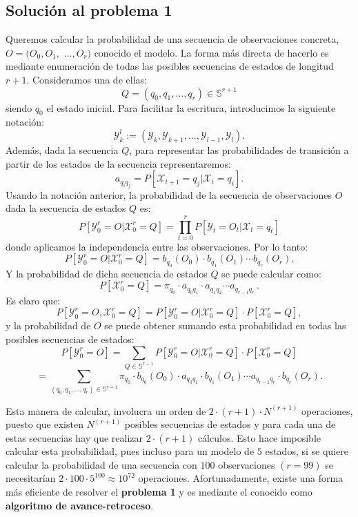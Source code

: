 \subsection{Solución al problema 1}
Queremos calcular la probabilidad de una secuencia de observaciones concreta, $O=(O_0,O_1,$ $\dots, O_r)$ conocido el modelo. La forma más directa de hacerlo es mediante enumeración de todas las posibles secuencias de estados de longitud $r+1$. Consideramos una de ellas:
\[Q=(q_0 , q_1 , \dots , q_r)\in\mathbb{S}^{r+1}\]
siendo $q_0$ el estado inicial. Para facilitar la escritura, introducimos la siguiente notación:
\[\mathcal{Y}_k^l:=(\mathcal{Y}_{k},\mathcal{Y}_{k+1},\dots,\mathcal{Y}_{l-1},\mathcal{Y}_{l}).\]
Además, dada la secuencia $Q$, para representar las probabilidades de transición a partir de los estados de la secuencia representaremos:
\[a_{q_iq_j}=P[\mathcal{X}_{t+1}=q_j|\mathcal{X}_t=q_i].\]
Usando la notación anterior, la probabilidad de la secuencia de observaciones $O$ dada la secuencia de estados $Q$ es:
\[P[\mathcal{Y}_0^r=O|\mathcal{X}_0^r=Q]=\prod_{t=0}^r P[\mathcal{Y}_{t}=O_t|\mathcal{X}_{t}=q_t]\]
donde aplicamos la independencia entre las observaciones. Por lo tanto:
\[P[\mathcal{Y}_0^r=O|\mathcal{X}_0^r=Q]=b_{q_0}(O_0)\cdot b_{q_1}(O_1)\cdots b_{q_r}(O_r).\]
Y la probabilidad de dicha secuencia de estados $Q$ se puede calcular como:
\[P[\mathcal{X}_0^r=Q]=\pi_{q_0}\cdot a_{q_0q_1}\cdot a_{q_1q_2}\cdots a_{q_{r-1}q_r}\,. \]
Es claro que:
\[P[\mathcal{Y}_0^r=O,\mathcal{X}_0^r=Q]=P[\mathcal{Y}_0^r=O|\mathcal{X}_0^r=Q]\cdot P[\mathcal{X}_0^r=Q], \]
y la probabilidad de $O$ se puede obtener sumando esta probabilidad en todas las posibles secuencias de estados:
\[P[\mathcal{Y}_0^r=O]=\sum_{Q\in\mathbb{S}^{r+1}}P[\mathcal{Y}_0^r=O|\mathcal{X}_0^r=Q]\cdot P[\mathcal{X}_0^r=Q]\]
\[=\sum_{(q_0 , q_1 , \dots , q_r)\in\mathbb{S}^{r+1}}\pi_{q_0}\cdot b_{q_0}(O_0)\cdot a_{q_0q_1}\cdot b_{q_1}(O_1)\cdots a_{q_{r-1}q_r}\cdot b_{q_r}(O_r).\]

Esta manera de calcular, involucra un orden de $2\cdot(r+1)\cdot N^{(r+1)}$ operaciones, puesto que existen $N^{(r+1)}$ posibles secuencias de estados y para cada una de estas secuencias hay que realizar $2\cdot(r+1)$ cálculos. Esto hace imposible calcular esta probabilidad, pues incluso para un modelo de $5$ estados, si se quiere calcular la probabilidad de una secuencia con $100$ observaciones $(r=99)$ se necesitarían $2\cdot100\cdot5^{100}\approx10^{72}$ operaciones. Afortunadamente, existe una forma más eficiente de resolver el \textbf{problema 1} y es mediante el conocido como \textbf{algoritmo de avance-retroceso}. 

